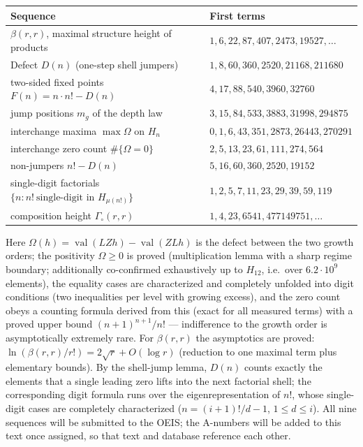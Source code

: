 \documentclass[11pt]{article}
\theoremstyle{definition}
\theoremstyle{remark}
\newcommand{\val}{\operatorname{val}}
\begin{document}
\begin{center}
\begin{tabular}{ll}
\toprule
Sequence & First terms\\
\midrule
$\beta(r,r)$, maximal structure height of products &
$1,6,22,87,407,2473,19527,\dots$\\
Defect $D(n)$ (one-step shell jumpers) &
$1,8,60,360,2520,21168,211680$\\
two-sided fixed points $F(n)=n\cdot n!-D(n)$ &
$4,17,88,540,3960,32760$\\
jump positions $m_g$ of the depth law &
$3,15,84,533,3883,31998,294875$\\
interchange maxima $\max\Omega$ on $H_n$ &
$0,1,6,43,351,2873,26443,270291$\\
interchange zero count $\#\{\Omega=0\}$ &
$2,5,13,23,61,111,274,564$\\
non-jumpers $n!-D(n)$ &
$5,16,60,360,2520,19152$\\
single-digit factorials $\{n: n!\ \text{single-digit in } H_{\mu(n!)}\}$ &
$1,2,5,7,11,23,29,39,59,119$\\
composition height $\Gamma_\circ(r,r)$ &
$1,4,23,6541,477149751,\dots$\\
\bottomrule
\end{tabular}
\end{center}

Here $\Omega(h)=\val(LZh)-\val(ZLh)$ is the defect between the two
growth orders; the positivity $\Omega\ge0$ is proved
(multiplication lemma with a sharp regime boundary; additionally
co-confirmed exhaustively up to $H_{12}$, i.e.\ over
$6.2\cdot10^9$ elements), the
equality cases are characterized and completely unfolded into digit
conditions (two inequalities per level with growing excess), and
the zero count obeys a counting formula derived from this (exact
for all measured terms) with a proved upper bound
$(n{+}1)^{n+1}/n!$ — indifference to the growth order is
asymptotically extremely rare. For
$\beta(r,r)$ the asymptotics are proved:
$\ln(\beta(r,r)/r!)=2\sqrt r+O(\log r)$ (reduction to one maximal
term plus elementary bounds). By the shell-jump lemma, $D(n)$
counts exactly the elements that a single leading zero lifts into
the next factorial shell; the corresponding digit formula runs over
the eigenrepresentation of $n!$, whose single-digit cases are
completely characterized ($n=(i{+}1)!/d-1$, $1\le d\le i$). All
nine sequences will be submitted to the OEIS; the A-numbers will be
added to this text once assigned, so that text and database
reference each other.
\end{document}
